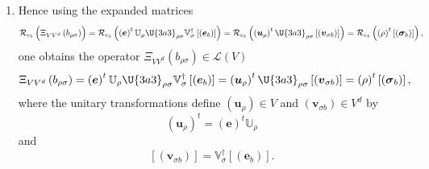 \documentclass[aps,preprint]{revtex4}
\begin{document}
\begin{enumerate}
\begin{enumerate}
\item $\U{3a3} $ is an $m\times n$ rectangular diagonal matrix with the
singular values $\lambda _{i}\geq 0$ on its diagonal. $\U{3a3} $ can be
enlarged to a $n\times n$ matrix by adding zero entries.

\item $\mathbb{V}$ is an $n\times n$ unitary matrix.

\item $n\geq m$ as $n=\dim \left\{ \limfunc{Dom}\left( \Xi _{VV^{d}}\left(
b_{\rho \sigma }\right) \right) \right\} $ and $m=\dim \left\{ \limfunc{Ran}%
\left( \Xi _{VV^{d}}\left( b_{\rho \sigma }\right) \right) \right\} .$
\end{enumerate}

\item Hence using the expanded matrices 
\begin{equation}
\mathcal{R}_{e_{b}}\left( \overset{}{\Xi _{VV^{d}}\left( b_{\rho \sigma
}\right) }\right) =\mathcal{R}_{e_{b}}\left( \overset{}{\left( \boldsymbol{e}%
\right) ^{t}\mathbb{U}_{\rho }\U{3a3} _{\rho \sigma }\mathbb{V}_{\sigma
}^{\dagger }\left[ \left( \boldsymbol{e}_{b}\right) \right] }\right) =%
\mathcal{R}_{e_{b}}\left( \overset{}{\left( \boldsymbol{u}_{\rho }\right)
^{t}\U{3a3} _{\rho \sigma }\left[ \left( \boldsymbol{v}_{\sigma b}\right) %
\right] }\right) =\mathcal{R}_{e_{b}}\left( \overset{}{\left( \rho \right)
^{t}\left[ \left( \boldsymbol{\sigma }_{b}\right) \right] }\right) ,
\end{equation}%
one obtains the operator $\Xi _{VV^{d}}\left( b_{\rho \sigma }\right) \in 
\mathcal{L}\left( V\right) $ 
\begin{equation}
\Xi _{VV^{d}}\left( b_{\rho \sigma }\right) =\left( \boldsymbol{e}\right)
^{t}\mathbb{U}_{\rho }\U{3a3} _{\rho \sigma }\mathbb{V}_{\sigma }^{\dagger }%
\left[ \left( \boldsymbol{e}_{b}\right) \right] =\left( \boldsymbol{u}_{\rho
}\right) ^{t}\U{3a3} _{\rho \sigma }\left[ \left( \boldsymbol{v}_{\sigma
b}\right) \right] =\left( \rho \right) ^{t}\left[ \left( \boldsymbol{\sigma }%
_{b}\right) \right] ,
\end{equation}%
where the unitary transformations define $\left( \boldsymbol{u}_{\rho
}\right) \in V$ and $\left( \boldsymbol{v}_{\sigma b}\right) \in V^{d}$ by 
\begin{equation}
\left( \boldsymbol{u}_{\rho }\right) ^{t}=\left( \boldsymbol{e}\right) ^{t}%
\mathbb{U}_{\rho }
\end{equation}%
and 
\begin{equation}
\left[ \left( \boldsymbol{v}_{\sigma b}\right) \right] =\mathbb{V}_{\sigma
}^{\dagger }\left[ \left( \boldsymbol{e}_{b}\right) \right] .
\end{equation}


\end{enumerate}
\end{document}

